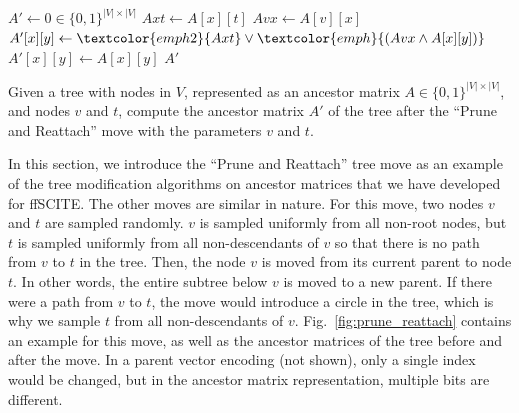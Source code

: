 \begin{algorithm}
    \begin{algorithmic}[1]
        \STATE $A' \leftarrow 0 \in \{0,1\}^{|V| \times |V|}$
            \STATE $Axt \leftarrow A[x][t]$ 
            \STATE $Avx \leftarrow A[v][x]$ 
                \label{alg1:condition}
                    \STATE {}        
                    \STATE {}
                    \STATE $A'[x][y] \leftarrow \textcolor{emph2}{Axt} \vee \textcolor{emph}{(Avx \wedge A[x][y])}$\label{alg1:twocases}
                \ELSE
                    \STATE {}
                    \STATE $A'[x][y] \leftarrow A[x][y]$\label{alg1:keepaxy}
                \ENDIF
            \ENDFOR
        \ENDFOR
        \RETURN $A'$
    \end{algorithmic}
    \caption{Given a tree with nodes in $V$, represented as an ancestor matrix $A \in \{0,1\}^{|V| \times |V|}$, and nodes $v$ and $t$, compute the ancestor matrix $A'$ of the tree after the ``Prune and Reattach'' move with the parameters $v$ and $t$.}
    \label{alg:prune_reattach}
\end{algorithm}

In this section, we introduce the ``Prune and Reattach'' tree move as an example of the tree modification algorithms on ancestor matrices that we have developed for \ac{ffSCITE}. The other moves are similar in nature. For this move, two nodes $v$ and $t$ are sampled randomly. $v$ is sampled uniformly from all non-root nodes, but $t$ is sampled uniformly from all non-descendants of $v$ so that there is no path from $v$ to $t$ in the tree. Then, the node $v$ is moved from its current parent to node $t$. In other words, the entire subtree below $v$ is moved to a new parent. If there were a path from $v$ to $t$, the move would introduce a circle in the tree, which is why we sample $t$ from all non-descendants of $v$. Fig.~\ref{fig:prune_reattach} contains an example for this move, as well as the ancestor matrices of the tree before and after the move. In a parent vector encoding (not shown), only a single index would be changed, but in the ancestor matrix representation, multiple bits are different.

